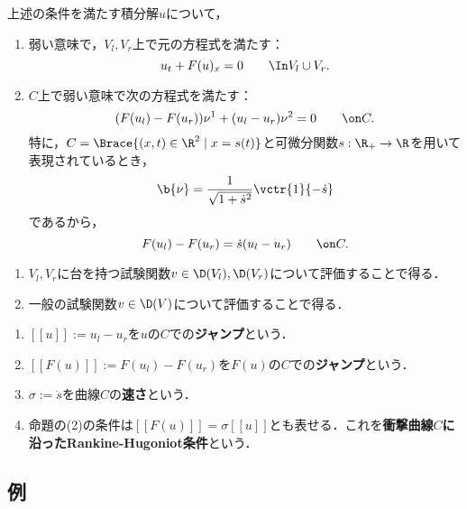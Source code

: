 \documentclass[uplatex,dvipdfmx]{jsreport}
\begin{document}
\begin{proposition}
    上述の条件を満たす積分解$u$について，
    \begin{enumerate}
        \item 弱い意味で，$V_l,V_r$上で元の方程式を満たす：
        \[u_t+F(u)_x=0\qquad\In V_l\cup V_r.\]
        \item $C$上で弱い意味で次の方程式を満たす：
        \[(F(u_l)-F(u_r))\nu^1+(u_l-u_r)\nu^2=0\qquad\on C.\]
        特に，$C=\Brace{(x,t)\in\R^2\mid x=s(t)}$と可微分関数$s:\R_+\to\R$を用いて表現されているとき，
        \[\b{\nu}=\frac{1}{\sqrt{1+\dot{s}^2}}\vctr{1}{-\dot{s}}\]
        であるから，
        \[F(u_l)-F(u_r)=\dot{s}(u_l-u_r)\qquad\on C.\]
    \end{enumerate}
\end{proposition}
\begin{Proof}\mbox{}
    \begin{enumerate}
        \item $V_l,V_r$に台を持つ試験関数$v\in\D(V_l),\D(V_r)$について評価することで得る．
        \item 一般の試験関数$v\in\D(V)$について評価することで得る．
    \end{enumerate}
\end{Proof}

\begin{definition}\mbox{}
    \begin{enumerate}
        \item $[[u]]:=u_l-u_r$を$u$の$C$での\textbf{ジャンプ}という．
        \item $[[F(u)]]:=F(u_l)-F(u_r)$を$F(u)$の$C$での\textbf{ジャンプ}という．
        \item $\sigma:=\dot{s}$を曲線$C$の\textbf{速さ}という．
        \item 命題の(2)の条件は$[[F(u)]]=\sigma[[u]]$とも表せる．これを\textbf{衝撃曲線$C$に沿ったRankine-Hugoniot条件}という．
    \end{enumerate}
\end{definition}

\subsection{例}
\end{document}
